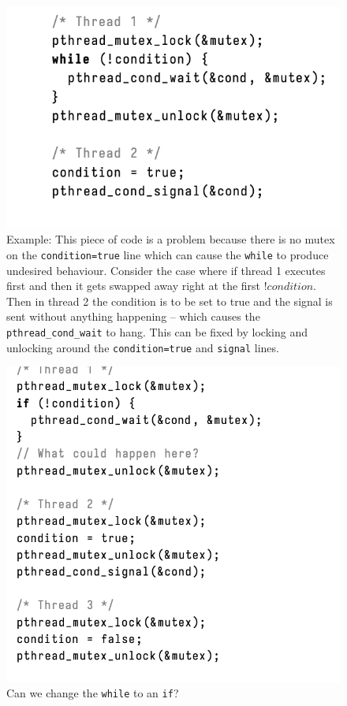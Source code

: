 \documentclass[../notes.tex]{subfiles}
\begin{document}
\begin{figure}[H]
    \centering
    \includegraphics[width=0.8\linewidth]{img/image_2023-03-08-14-45-57.png}
    \caption{Example: This piece of code is a problem because there is no mutex on the \texttt{condition=true} line which can cause the \texttt{while} to produce undesired behaviour. Consider the case where if thread 1 executes first and then it gets swapped away right at the first $ !condition $. Then in thread 2 the condition is to be set to true and the signal is sent without anything happening -- which causes the \texttt{pthread\_cond\_wait} to hang. This can be fixed by locking and unlocking around the \texttt{condition=true} and \texttt{signal} lines.}
\end{figure}


\begin{figure}[H]
    \centering
    \includegraphics[width=0.8\linewidth]{img/image_2023-03-08-14-53-14.png}
    \caption{Can we change the \texttt{while} to an \texttt{if}?}
\end{figure}
\end{document}
